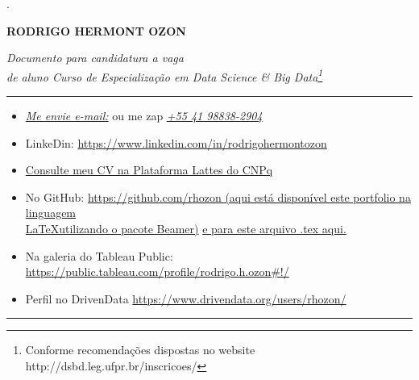 \documentclass{article}
\begin{document}
.

\vspace{.5cm}


\begin{center}
\textbf{RODRIGO HERMONT OZON}
\end{center}

\begin{flushleft}
\textit{Documento para candidatura a vaga\\ de aluno Curso de Especialização em Data Science \& Big Data\footnote{Conforme recomendações dispostas no website http://dsbd.leg.ufpr.br/inscricoes/}}
\end{flushleft}
\rule[6cm]{6in}{0.1pt} 

\vspace{-5.5cm}
\begin{itemize} 
\item \textit{\textcolor{blue}{\href{mailto:rodrigoozon@yahoo.com.br}{Me envie e-mail:}}} ou me zap \textit{\textcolor{blue}{\href{https://api.whatsapp.com/send?phone=5541988382904&text=Ol\%C3\%A1\%20Rodrigo\%2C\%20vi\%20seu\%20portf\%C3\%B3lio\%20no\%20linkedin\%2C\%20tenho\%20interesse\%20em\%20conhecer\%20um\%20pouco\%20mais\%20do\%20seu\%20trabalho.\%20Podemos\%20conversar\%20a\%20respeito\%20\%3F}{+55 41 98838-2904}}} 
\item LinkeDin: \url{https://www.linkedin.com/in/rodrigohermontozon}

\item \href{http://lattes.cnpq.br/3532649625879285}{Consulte meu CV na Plataforma Lattes do CNPq}

\item No GitHub: \href{https://github.com/rhozon/Portfolio/blob/master/Portfolio.tex}{https://github.com/rhozon (aqui está disponível este portfolio na linguagem\\ \LaTeX utilizando o pacote Beamer)} \href{https://github.com/rhozon/Candidatura-UFPR}{e para este arquivo .tex aqui.}

\item Na galeria do Tableau Public: \href{https://public.tableau.com/profile/rodrigo.h.ozon#!/}{https://public.tableau.com/profile/rodrigo.h.ozon#!/}

\item Perfil no DrivenData \href{https://www.drivendata.org/users/rhozon/}{https://www.drivendata.org/users/rhozon/}
\end{itemize}
\rule[6cm]{6in}{0.1pt} 
\end{document}
